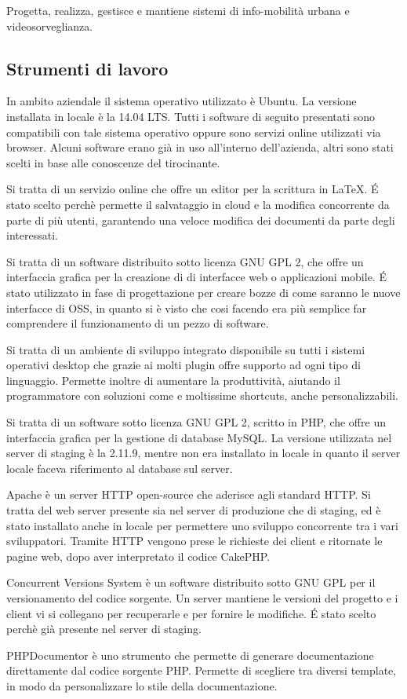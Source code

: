 Progetta, realizza, gestisce e mantiene sistemi di info-mobilità urbana e videosorveglianza.

\subsection{Strumenti di lavoro}\label{strumentidilavoro}
In ambito aziendale il sistema operativo utilizzato è Ubuntu. La versione installata in locale è la 14.04 LTS.
Tutti i software di seguito presentati sono compatibili con tale sistema operativo oppure sono servizi online utilizzati via browser. Alcuni software erano già in uso all'interno dell'azienda, altri sono stati scelti in base alle conoscenze del tirocinante.

Si tratta di un servizio online che offre un editor per la scrittura in \LaTeX. \'E stato scelto perchè permette il salvataggio in cloud e la modifica concorrente da parte di più utenti, garantendo una veloce modifica dei documenti da parte degli interessati. 

Si tratta di un software distribuito sotto licenza GNU GPL 2, che offre un interfaccia grafica per la creazione di  di interfacce web o applicazioni mobile. \'E stato utilizzato in fase di progettazione per creare bozze di come saranno le nuove interfacce di OSS, in quanto si è visto che cosi facendo era più semplice far comprendere il funzionamento di un pezzo di software.

Si tratta di un ambiente di sviluppo integrato  disponibile su tutti i sistemi operativi desktop che grazie ai molti plugin offre supporto ad ogni tipo di linguaggio.
Permette inoltre di aumentare la produttività, aiutando il programmatore con soluzioni come  e moltissime shortcuts, anche personalizzabili.

Si tratta di un software sotto licenza GNU GPL 2, scritto in PHP, che offre un interfaccia grafica per la gestione di database MySQL. La versione utilizzata nel server di staging è la 2.11.9, mentre non era installato in locale in quanto il server locale faceva riferimento al database sul server.

Apache è un server HTTP open-source che aderisce agli standard HTTP. Si tratta del web server presente sia nel server di produzione che di staging, ed è stato installato anche in locale per permettere uno sviluppo concorrente tra i vari sviluppatori. 
Tramite HTTP vengono prese le richieste dei client e ritornate le pagine web, dopo aver interpretato il codice CakePHP.

Concurrent Versions System è un software distribuito sotto GNU GPL per il versionamento del codice sorgente.
Un server mantiene le versioni del progetto e i client vi si collegano per recuperarle e per fornire le modifiche.
\'E stato scelto perchè già presente nel server di staging.

PHPDocumentor è uno strumento che permette di generare documentazione direttamente dal codice sorgente PHP. Permette di scegliere tra diversi template, in modo da personalizzare lo stile della documentazione.
